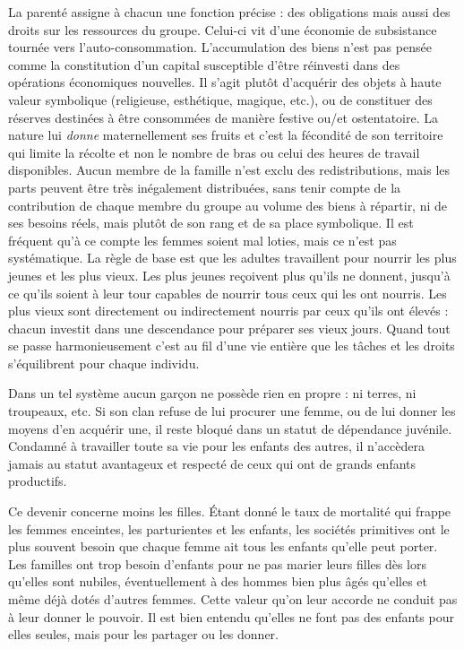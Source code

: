 La parenté assigne à chacun une fonction précise : des obligations mais aussi des droits sur les ressources du groupe. Celui-ci vit d'une économie de subsistance tournée vers l'auto-consommation. L'accumulation des biens n'est pas pensée comme la constitution d'un capital susceptible d'être réinvesti dans des opérations économiques nouvelles. Il s'agit plutôt d'acquérir des objets à haute valeur symbolique (religieuse, esthétique, magique, etc.), ou de constituer des réserves destinées à être consommées de manière festive ou/et ostentatoire. La nature lui \emph{donne} maternellement ses fruits et c'est la fécondité de son territoire qui limite la récolte et non le nombre de bras ou celui des heures de travail disponibles. Aucun membre de la famille n'est exclu des redistributions, mais les parts peuvent être très inégalement distribuées, sans tenir compte de la contribution de chaque membre du groupe au volume des biens à répartir, ni de ses besoins réels, mais plutôt de son rang et de sa place symbolique. Il est fréquent qu’à ce compte les femmes soient mal loties, mais ce n’est pas systématique. La règle de base est que les adultes travaillent pour nourrir les plus jeunes et les plus vieux. Les plus jeunes reçoivent plus qu'ils ne donnent, jusqu'à ce qu'ils soient à leur tour capables de nourrir tous ceux qui les ont nourris. Les plus vieux sont directement ou indirectement nourris par ceux qu'ils ont élevés : chacun investit dans une descendance pour préparer ses vieux jours. Quand tout se passe harmonieusement c'est au fil d'une vie entière que les tâches et les droits s'équilibrent pour chaque individu. 

Dans un tel système aucun garçon ne possède rien en propre : ni terres, ni troupeaux, etc. Si son clan refuse de lui procurer une femme, ou de lui donner les moyens d'en acquérir une, il reste bloqué dans un statut de dépendance juvénile. Condamné à travailler toute sa vie pour les enfants des autres, il n'accèdera jamais au statut avantageux et respecté de ceux qui ont de grands enfants productifs.

Ce devenir concerne moins les filles. Étant donné le taux de mortalité qui frappe les femmes enceintes, les parturientes et les enfants, les sociétés primitives ont le plus souvent besoin que chaque femme ait tous les enfants qu'elle peut porter. Les familles ont trop besoin d'enfants pour ne pas marier leurs filles dès lors qu'elles sont nubiles, éventuellement à des hommes bien plus âgés qu'elles et même déjà dotés d'autres femmes. Cette valeur qu'on leur accorde ne conduit pas à leur donner le pouvoir. Il est bien entendu qu'elles ne font pas des enfants pour elles seules, mais pour les partager ou les donner. 

